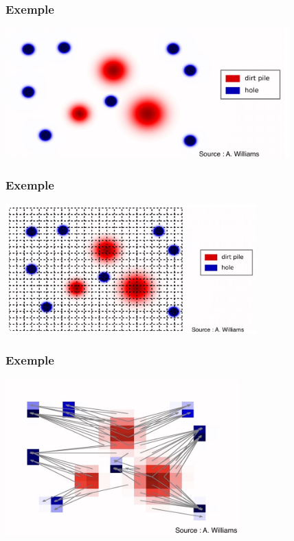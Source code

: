 \documentclass[9pt]{beamer}
\begin{document}
\begin{frame}
\frametitle{\bf Exemple}
 
\centering \includegraphics[height=5.0cm]{ex1}

\end{frame}

\begin{frame}
\frametitle{\bf Exemple}
 
\centering \includegraphics[height=5.0cm]{ex2}

\end{frame}

\begin{frame}
\frametitle{\bf Exemple}
 
\centering \includegraphics[height=6.0cm]{ex3}

\end{frame}
\end{document}
